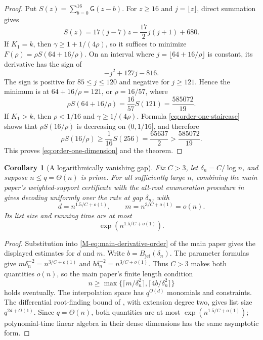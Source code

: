 \documentclass[11pt,letterpaper]{article}
\newtheorem{corollary}[corollary]{Corollary}
\theoremstyle{definition}
\newcommand{\Bjet}{B_{\mathrm{jet}}}
\begin{document}
\begin{proof}
Put $S(z)=\sum_{b=0}^{16}\mathsf G(z-b)$.  For $z\geq16$ and $j=\lfloor z\rfloor$, direct summation
gives
\begin{equation}
  S(z)=17(j-7)z-\frac{17}{2}j(j+1)+680.
  \label{eq:order-one-staircase}
\end{equation}
If $K_1=k$, then $\gamma\geq1+1/(4\rho)$, so it suffices to minimize
$F(\rho)=\rho S(64+16/\rho)$.  On an interval where
$j=\lfloor64+16/\rho\rfloor$ is constant, its derivative has the sign of
\[
  -j^2+127j-816.
\]
The sign is positive for $85\leq j\leq120$ and negative for $j\geq121$.  Hence the minimum is at
$64+16/\rho=121$, or $\rho=16/57$, where
\[
  \rho S(64+16/\rho)=\frac{16}{57}S(121)=\frac{585072}{19}.
\]
If $K_1>k$, then $\rho<1/16$ and $\gamma\geq1/(4\rho)$.  Formula
\eqref{eq:order-one-staircase} shows that $\rho S(16/\rho)$ is decreasing on
$(0,1/16]$, and therefore
\[
  \rho S(16/\rho)\geq\frac1{16}S(256)=\frac{65637}{2}>
  \frac{585072}{19}.
\]
This proves \eqref{eq:order-one-dimension} and the theorem.
\end{proof}

\begin{corollary}[A logarithmically vanishing gap]
\label{cor:logarithmically-vanishing-gap}
Fix $C>3$, let $\delta_n=C/\log n$, and suppose $n\leq q=\Theta(n)$ is prime. For all sufficiently
large $n$, combining the main paper's weighted-support certificate with the
all-root enumeration procedure in  gives decoding
uniformly over the rate at gap $\delta_n$, with
\[
  d=n^{1.5/C+o(1)},
  \qquad
  m=n^{3/C+o(1)}=o(n).
\]
Its list size and running time are at most
\[
  \exp\!\left(n^{1.5/C+o(1)}\right).
\]
\end{corollary}

\begin{proof}
Substitution into \eqref{M-eq:main-derivative-order} of the main paper gives the displayed estimates for $d$ and $m$.
Write $b=\Bjet(\delta_n)$. The parameter formulas give
$m\delta_n^{-2}=n^{3/C+o(1)}$ and
$b\delta_n^{-2}=n^{3/C+o(1)}$. Thus $C>3$ makes both quantities
$o(n)$, so the main paper's finite length condition
\[
 n\geq\max\{\lceil m/\delta_n^2\rceil,
              \lceil4b/\delta_n^2\rceil\}
\]
holds eventually.
The interpolation space has $q^{O(d)}$ monomials and constraints.  The differential root-finding
bound of , with extension degree two, gives list size $q^{2d+O(1)}$.  Since
$q=\Theta(n)$, both quantities are at most
$\exp(n^{1.5/C+o(1)})$; polynomial-time linear algebra in their dense dimensions has the same
asymptotic form.
\end{proof}
\end{document}
